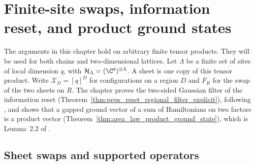 \chapter{Finite-site swaps, information reset, and product ground states}
\label{ch:finite_site_reset}

The arguments in this chapter hold on arbitrary finite tensor products.
They will be used for both chains and two-dimensional lattices. Let
$\Lambda$ be a finite set of sites of local dimension $q$, with
$\mathcal H_\Lambda=(\C^q)^{\otimes\Lambda}$. A sheet is one copy of
this tensor product. Write $\mathcal X_D=[q]^D$ for configurations on a
region $D$ and $F_R$ for the swap of the two sheets on $R$.
The chapter proves the two-sided Gaussian filter of the information reset
(Theorem~\ref{thm:peps_reset_regional_filter_explicit}), following
\cite{OpenAI2026PolynomialPEPS}, and shows that a gapped ground vector of a
sum of Hamiltonians on two factors is a product vector
(Theorem~\ref{thm:area_law_product_ground_state}), which is Lemma~2.2 of
\cite{OpenAI2026AreaLaw}.

\section{Sheet swaps and supported operators}

